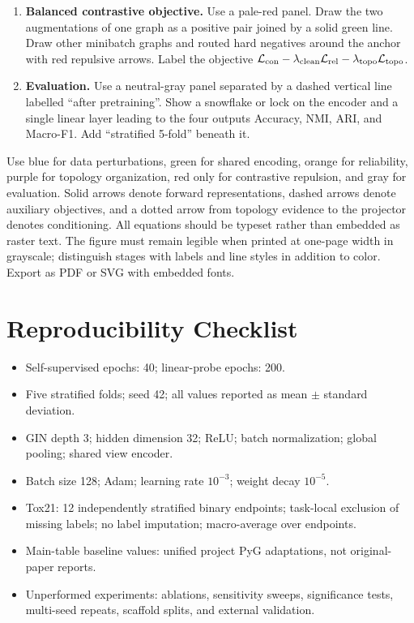 \documentclass[10pt,twocolumn]{article}
\begin{document}
\begin{enumerate}[leftmargin=*]
    \item \textbf{Balanced contrastive objective.} Use a pale-red panel. Draw the two augmentations of one graph as a positive pair joined by a solid green line. Draw other minibatch graphs and routed hard negatives around the anchor with red repulsive arrows. Label the objective $\mathcal L_{\rm con}-\lambda_{\rm clean}\mathcal L_{\rm rel}-\lambda_{\rm topo}\mathcal L_{\rm topo}$.
    \item \textbf{Evaluation.} Use a neutral-gray panel separated by a dashed vertical line labelled ``after pretraining''. Show a snowflake or lock on the encoder and a single linear layer leading to the four outputs Accuracy, NMI, ARI, and Macro-F1. Add ``stratified 5-fold'' beneath it.
\end{enumerate}

Use blue for data perturbations, green for shared encoding, orange for reliability, purple for topology organization, red only for contrastive repulsion, and gray for evaluation. Solid arrows denote forward representations, dashed arrows denote auxiliary objectives, and a dotted arrow from topology evidence to the projector denotes conditioning. All equations should be typeset rather than embedded as raster text. The figure must remain legible when printed at one-page width in grayscale; distinguish stages with labels and line styles in addition to color. Export as PDF or SVG with embedded fonts.

\section{Reproducibility Checklist}

\begin{itemize}[leftmargin=*]
    \item Self-supervised epochs: 40; linear-probe epochs: 200.
    \item Five stratified folds; seed 42; all values reported as mean $\pm$ standard deviation.
    \item GIN depth 3; hidden dimension 32; ReLU; batch normalization; global pooling; shared view encoder.
    \item Batch size 128; Adam; learning rate $10^{-3}$; weight decay $10^{-5}$.
    \item Tox21: 12 independently stratified binary endpoints; task-local exclusion of missing labels; no label imputation; macro-average over endpoints.
    \item Main-table baseline values: unified project PyG adaptations, not original-paper reports.
    \item Unperformed experiments: ablations, sensitivity sweeps, significance tests, multi-seed repeats, scaffold splits, and external validation.
\end{itemize}
\end{document}
